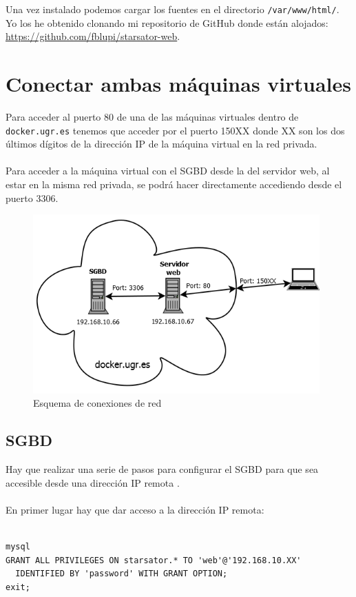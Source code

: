 Una vez instalado podemos cargar los fuentes en el directorio \texttt{/var/www/html/}. Yo los he obtenido clonando mi repositorio de GitHub donde están alojados: \url{https://github.com/fblupi/starsator-web}.

\section{Conectar ambas máquinas virtuales}

Para acceder al puerto 80 de una de las máquinas virtuales dentro de \texttt{docker.ugr.es} tenemos que acceder por el puerto 150XX donde XX son los dos últimos dígitos de la dirección IP de la máquina virtual en la red privada.
\\ \\
Para acceder a la máquina virtual con el SGBD desde la del servidor web, al estar en la misma red privada, se podrá hacer directamente accediendo desde el puerto 3306.

\begin{figure}[H]
	\centering
	\includegraphics[width=11cm]{img/esquema-red}
	\caption{Esquema de conexiones de red}
	\label{fig:esquema-red}
\end{figure}

\subsection{SGBD}
\label{sec:conectar-mvs-sgbd}

Hay que realizar una serie de pasos para configurar el SGBD para que sea accesible desde una dirección IP remota \cite{EnableRemoteAccessToMariaDB}.
\\ \\
En primer lugar hay que dar acceso a la dirección IP remota:
\\ \\
\begin{lstlisting}
mysql
GRANT ALL PRIVILEGES ON starsator.* TO 'web'@'192.168.10.XX' 
  IDENTIFIED BY 'password' WITH GRANT OPTION;
exit;
\end{lstlisting}

